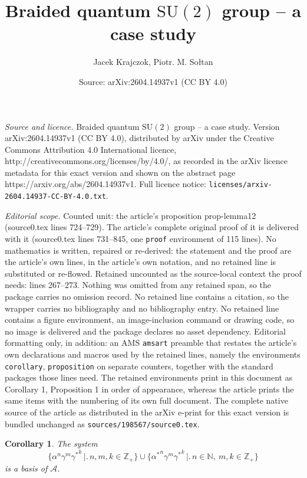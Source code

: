 \documentclass[10pt,a4paper]{amsart}
\title{Braided quantum $\mathrm{SU}(2)$ group -- a case study}
\author{Jacek Krajczok, Piotr. M. So{\l}tan}
\date{Source: arXiv:2604.14937v1 (CC BY 4.0)}
\newtheorem{corollary}{Corollary}
\newcommand{\NN}{\mathbb{N}}
\newcommand{\ZZ}{\mathbb{Z}}
\newcommand{\cA}{\mathscr{A}}
\begin{document}
\maketitle

\noindent\emph{Source and licence.} Braided quantum $\mathrm{SU}(2)$ group -- a case study. Version arXiv:2604.14937v1 (CC BY 4.0), distributed by arXiv under the Creative Commons Attribution 4.0 International licence, http://creativecommons.org/licenses/by/4.0/, as recorded in the arXiv licence metadata for this exact version and shown on the abstract page https://arxiv.org/abs/2604.14937v1. Full licence notice: \texttt{licenses/arxiv-2604.14937-CC-BY-4.0.txt}.\par\smallskip

\noindent\textit{Editorial scope.} Counted unit: the article's proposition prop-lemma12 (source0.tex lines 724--729). The article's complete original proof of it is delivered with it (source0.tex lines 731--845, one \texttt{proof} environment of 115 lines). No mathematics is written, repaired or re-derived: the statement and the proof are the article's own lines, in the article's own notation, and no retained line is substituted or re-flowed.  Retained uncounted as the source-local context the proof needs: lines 267--273.  Nothing was omitted from any retained span, so the package carries no omission record.  No retained line contains a citation, so the wrapper carries no bibliography and no bibliography entry.  No retained line contains a figure environment, an image-inclusion command or drawing code, so no image is delivered and the package declares no asset dependency.  Editorial formatting only, in addition: an AMS \texttt{amsart} preamble that restates the article's own declarations and macros used by the retained lines, namely the environments \texttt{corollary}, \texttt{proposition} on separate counters, together with the standard packages those lines need.  The retained environments print in this document as Corollary 1, Proposition 1 in order of appearance, whereas the article prints the same items with the numbering of its own full document.  The complete native source of the article as distributed in the arXiv e-print for this exact version is bundled unchanged as \texttt{sources/198567/source0.tex}.
\begin{corollary}\label{cor-bazacA}
The system
\begin{equation}\label{eq-bazacA}
\bigl\{\alpha^n\gamma^m{\gamma^*}^k\,\bigr|\bigl.\,n,m,k\in\ZZ_+\bigr\}\cup\bigl\{{\alpha^*}^n\gamma^m{\gamma^*}^k\,\bigr|\bigl.\,n\in\NN,\:m,k\in\ZZ_+\bigr\}
\end{equation}
is a basis of $\cA$.
\end{corollary}
\end{document}
